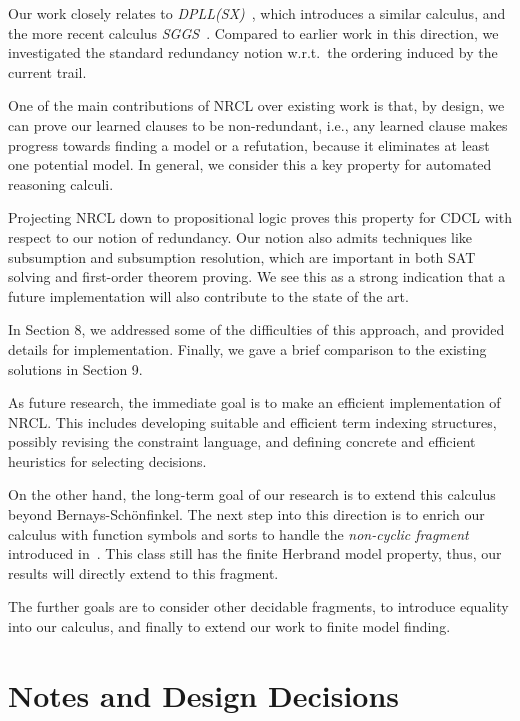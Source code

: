\documentclass[a4paper]{article}
\newcommand{\mEPR}{Bernays-Sch\"onfinkel}
\begin{document}
{Our work closely relates to \emph{DPLL(SX)}~\cite{DPLLSX10}, which introduces a similar calculus,
and the more recent calculus \emph{SGGS}~\cite{SGGSExposition}.
Compared to earlier work in this direction, we investigated the standard redundancy notion
w.r.t.\ the ordering induced by the current trail.

One of the main contributions of NRCL over existing work is that, by design, 
we can prove our learned clauses to be non-redundant, i.e., any learned clause makes progress 
towards finding a model or a refutation, because it eliminates at least one potential model. 
In general, we consider this a key property for automated reasoning calculi.

Projecting NRCL down to propositional logic proves this property for CDCL 
with respect to our notion of redundancy. 
Our notion also admits techniques like subsumption and subsumption resolution, 
which are important in both SAT solving and first-order theorem proving. 
We see this as a strong indication that a future implementation 
will also contribute to the state of the art.

In Section 8, we addressed some of the difficulties of this approach, and provided 
details for implementation.
Finally, we gave a brief comparison to the existing solutions in Section 9.

As future research, the immediate goal is to 
make an efficient implementation of NRCL.
This includes developing suitable and efficient term indexing structures, possibly revising the constraint language, and 
defining concrete and efficient heuristics for selecting decisions.

On the other hand, the long-term goal of our research is to extend this calculus beyond {\mEPR}.
The next step into this direction is to enrich our calculus with function symbols and sorts to handle the
\emph{non-cyclic fragment} introduced in~\cite{Noncyclic13}. 
This class still has the finite Herbrand model property, thus, our results will directly extend to this fragment.

The further goals are to consider other decidable fragments, to introduce equality into our calculus, and finally 
to extend our work to finite model finding.
% 

\ifdefined\PRINTNOTES
\section{Notes and Design Decisions}
}
\end{document}
